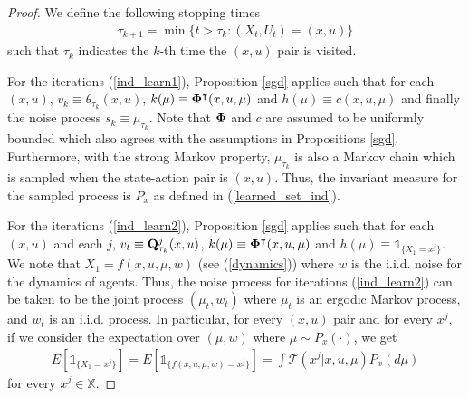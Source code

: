 \documentclass[twoside,11pt]{article}
\begin{document}
\begin{proof}
We define the following stopping times 
\begin{align*}
    \tau_{k+1} = \min{\{t> \tau_k: (X_t,U_t)=(x,u) \}}
\end{align*}
such that $\tau_k$ indicates the $k$-th time the $(x,u)$ pair is visited.

For the iterations (\ref{ind_learn1}), Proposition \ref{sgd} applies such that for each $(x,u)$,  $v_k\equiv \theta_{\tau_k}(x,u)$, $k(\mu) \equiv {\bf \Phi}^\intercal(x,u,\mu)$ and $h(\mu) \equiv c(x,u,\mu)$ and finally the noise process $s_k\equiv \mu_{\tau_k}$. Note that ${\bf \Phi}$ and $c$ are assumed to be uniformly bounded which also agrees with the assumptions in Propositions \ref{sgd}. Furthermore, with the strong Markov property, $\mu_{\tau_k}$ is also a Markov chain which is sampled when the state-action pair is $(x,u)$. Thus, the invariant measure for the sampled process is $P_{x}$  as defined in (\ref{learned_set_ind}).

For the iterations (\ref{ind_learn2}),  Proposition \ref{sgd} applies such that for each $(x,u)$ and each $j$,  $v_t\equiv {\bf Q}^j_{\tau_k}(x,u)$, $k(\mu) \equiv {\bf \Phi}^\intercal(x,u,\mu)$ and $h(\mu) \equiv \mathds{1}_{\{X_{1} =x^j  \}}$. We note that $X_{1} = f(x,u,\mu,w)$ (see (\ref{dynamics})) where $w$ is the i.i.d. noise for the dynamics of agents. Thus, the noise process for iterations (\ref{ind_learn2}) can be taken to be the joint process $(\mu_t,w_t)$ where $\mu_t$ is an ergodic Markov process, and $w_t$ is an i.i.d. process. In particular, for every $(x,u)$ pair and for every $x^j$, if we consider the expectation over $(\mu,w)$ where $\mu\sim P_{x}(\cdot)$,  we get
\begin{align*}
E\left[ \mathds{1}_{\{X_{1} =x^j  \}}\right] = E\left[ \mathds{1}_{\{f(x,u,\mu,w) =x^j  \}}\right] =\int  \mathcal{T}(x^j|x,u,\mu)P_{x}(d\mu)
\end{align*}
for every $x^j\in \mathds{X}$.


\end{proof}
\end{document}
